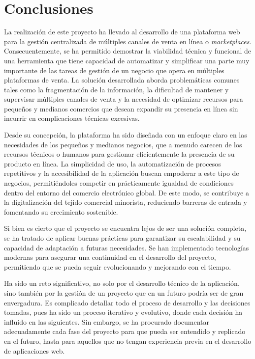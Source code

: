 \chapter{Conclusiones}
\label{chap:conclusiones}

La realización de este proyecto ha llevado al desarrollo de una plataforma web para la gestión centralizada de múltiples canales de venta en línea o \textit{marketplaces}. Consecuentemente, se ha permitido demostrar la viabilidad técnica y funcional de una herramienta que tiene capacidad de automatizar y simplificar una parte muy importante de las tareas de gestión de un negocio que opera en múltiples plataformas de venta. La solución desarrollada aborda problemáticas comunes tales como la fragmentación de la información, la dificultad de mantener y supervisar múltiples canales de venta y la necesidad de optimizar recursos para pequeños y medianos comercios que desean expandir su presencia en línea sin incurrir en complicaciones técnicas excesivas.

Desde su concepción, la plataforma ha sido diseñada con un enfoque claro en las necesidades de los pequeños y medianos negocios, que a menudo carecen de los recursos técnicos o humanos para gestionar eficientemente la presencia de su producto en línea. La simplicidad de uso, la automatización de procesos repetitivos y la accesibilidad de la aplicación buscan empoderar a este tipo de negocios, permitiéndoles competir en prácticamente igualdad de condiciones dentro del entorno del comercio electrónico global. De este modo, se contribuye a la digitalización del tejido comercial minorista, reduciendo barreras de entrada y fomentando su crecimiento sostenible.

Si bien es cierto que el proyecto se encuentra lejos de ser una solución completa, se ha tratado de aplicar buenas prácticas para garantizar su escalabilidad y su capacidad de adaptación a futuras necesidades. Se han implementado tecnologías modernas para asegurar una continuidad en el desarrollo del proyecto, permitiendo que se pueda seguir evolucionando y mejorando con el tiempo.

Ha sido un reto significativo, no solo por el desarrollo técnico de la aplicación, sino también por la gestión de un proyecto que en un futuro podría ser de gran envergadura. Es complicado detallar todo el proceso de desarrollo y las decisiones tomadas, pues ha sido un proceso iterativo y evolutivo, donde cada decisión ha influido en las siguientes. Sin embargo, se ha procurado documentar adecuadamente cada fase del proyecto para que pueda ser entendido y replicado en el futuro, hasta para aquellos que no tengan experiencia previa en el desarrollo de aplicaciones web.

